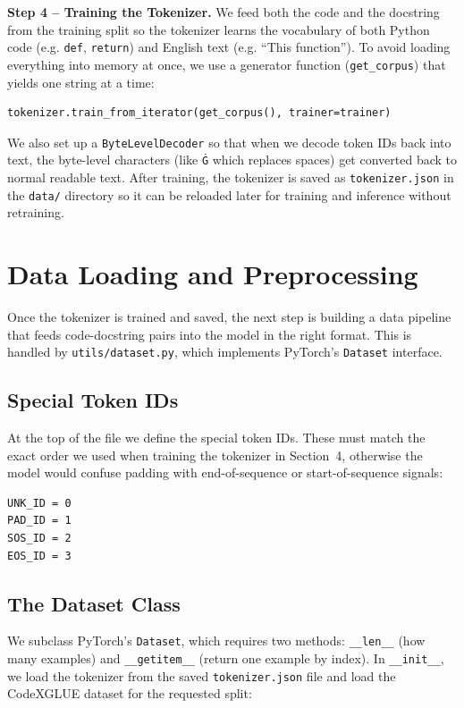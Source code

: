 \documentclass[11pt]{article}
\begin{document}
\textbf{Step 4 -- Training the Tokenizer.} We feed both the code and the docstring from the training split so the tokenizer learns the vocabulary of both Python code (e.g. \texttt{def}, \texttt{return}) and English text (e.g. ``This function''). To avoid loading everything into memory at once, we use a generator function (\texttt{get\_corpus}) that yields one string at a time:

\begin{lstlisting}[style=python]
tokenizer.train_from_iterator(get_corpus(), trainer=trainer)
\end{lstlisting}

We also set up a \texttt{ByteLevelDecoder} so that when we decode token IDs back into text, the byte-level characters (like \texttt{\.{G}} which replaces spaces) get converted back to normal readable text. After training, the tokenizer is saved as \texttt{tokenizer.json} in the \texttt{data/} directory so it can be reloaded later for training and inference without retraining.

\section{Data Loading and Preprocessing}

Once the tokenizer is trained and saved, the next step is building a data pipeline that feeds code-docstring pairs into the model in the right format. This is handled by \texttt{utils/dataset.py}, which implements PyTorch's \texttt{Dataset} interface.

\subsection{Special Token IDs}

At the top of the file we define the special token IDs. These must match the exact order we used when training the tokenizer in Section~4, otherwise the model would confuse padding with end-of-sequence or start-of-sequence signals:

\begin{lstlisting}[style=python]
UNK_ID = 0
PAD_ID = 1
SOS_ID = 2
EOS_ID = 3
\end{lstlisting}

\subsection{The Dataset Class}

We subclass PyTorch's \texttt{Dataset}, which requires two methods: \texttt{\_\_len\_\_} (how many examples) and \texttt{\_\_getitem\_\_} (return one example by index). In \texttt{\_\_init\_\_}, we load the tokenizer from the saved \texttt{tokenizer.json} file and load the CodeXGLUE dataset for the requested split:
\end{document}
